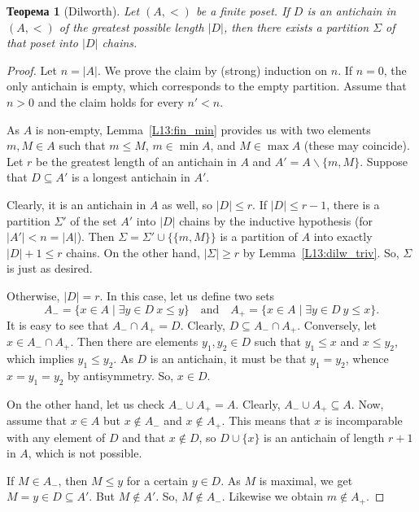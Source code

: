 \documentclass[12pt,notitlepage]{article}
\theoremstyle{plain}
\newtheorem{thm}{Теорема}[section]
\theoremstyle{definition}
\theoremstyle{plain}
\newcommand{\sbs}{\subseteq}
\renewcommand{\setminus}{\smallsetminus}
\newcommand{\1}{\mathbf{1}}
\newcommand{\0}{\mathbf{0}}
\begin{document}
\begin{thm}[Dilworth]
	Let $(A, <)$ be a finite poset. If $D$ is an antichain in $(A, <)$ of the greatest possible length $|D|$, then there exists a partition $\Sigma$ of that poset into $|D|$ chains.
\end{thm}
\begin{proof}
	Let $n = |A|$. We prove the claim by (strong) induction on $n$. If $n = 0$, the only antichain is empty, which corresponds to the empty partition. Assume that $n > 0$ and the claim holds for every $n' < n$.
	
	As $A$ is non-empty, Lemma~\ref{L13:fin_min} provides us with two elements $m, M \in A$ such that $m \leq M$, $m \in \min A$, and $M \in \max A$ (these may coincide). Let $r$ be the greatest length of an antichain in $A$ and $A' = A \setminus \{ m, M \}$. Suppose that $D \sbs A'$ is a longest antichain in $A'$.
	
	Clearly, it is an antichain in $A$ as well, so $|D| \leq r$. If $|D| \leq r - 1$, there is a partition $\Sigma'$ of the set $A'$ into $|D|$ chains by the inductive hypothesis (for $|A'| <  n =|A|$). Then $\Sigma = \Sigma' \cup \{ \{ m, M \} \}$ is a partition of $A$ into exactly $|D| + 1 \leq r$ chains. On the other hand, $|\Sigma| \geq r$ by Lemma~\ref{L13:dilw_triv}. So, $\Sigma$ is just as desired.
	
	Otherwise, $|D| = r$. In this case, let us define two sets
	$$A_{-} = \{ x \in A \mid \exists y \in D\ x \leq y  \}\quad\mbox{and}\quad A_{+} = \{ x \in A \mid \exists y \in D\ y \leq x \}.$$
	It is easy to see that $A_{-} \cap A_{+} = D$. Clearly, $D \sbs A_{-} \cap A_{+}$. Conversely, let $x \in A_{-} \cap A_{+}$. Then there are elements $y_1, y_2 \in D$ such that $y_1 \leq x$ and $x \leq y_2$, which implies $y_1 \leq y_2$. As $D$ is an antichain, it must be that $y_1 = y_2$, whence $x = y_1 = y_2$ by antisymmetry. So, $x \in D$.
	
	On the other hand, let us check $A_{-} \cup A_{+} = A$. Clearly, $A_{-} \cup A_{+} \sbs A$. Now, assume that $x \in A$ but $x \notin A_{-}$ and $x \notin A_{+}$. This means that $x$ is incomparable with any element of $D$ and that $x \notin D$, so $D \cup \{ x \}$ is an antichain of length $r + 1$ in $A$, which is not possible.
	
	If $M \in A_{-}$, then $M \leq y$ for a certain $y \in D$. As $M$ is maximal, we get $M = y \in D \sbs A'$. But $M \notin A'$. So, $M \notin A_{-}$. Likewise we obtain $m \notin A_{+}$.
	

\end{proof}
\end{document}

